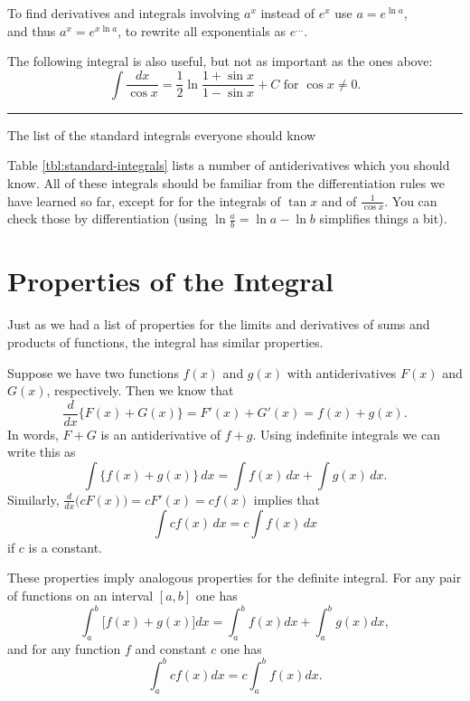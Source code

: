 \begin{table}[hb]
  To find derivatives and integrals involving $a^x$ instead of $e^x$ use
  $a = e^{\ln a}$,\\
  and thus $a^{x} = e^{x\ln a}$, to rewrite all exponentials as $e^{\ldots}$.
  \smallskip

  The following integral is also useful, but not as important as the
  ones above:
  \[
  \int \frac{ d x}{\cos x} = \frac12 \ln\frac{1+\sin x}{1-\sin x} +C
  \text{ for }\cos x\neq 0.
  \]
  \rule[1pt]{\textwidth}{2pt}
  \caption{The list of the standard integrals everyone should know}
  \label{tbl:standard-integrals}
\end{table}

Table \ref{tbl:standard-integrals} lists a number of antiderivatives which you
should know.  All of these integrals should be familiar from the
differentiation rules we have learned so far, except for for the integrals of
$\tan x$ and of $\frac1{\cos x}$.  You can check those by differentiation
(using $\ln\frac ab=\ln a-\ln b$ simplifies things a bit).


\section{Properties of the Integral}
Just as we had a list of properties for the limits and derivatives of
sums and products of functions, the integral has similar properties.

Suppose we have two functions $f(x)$ and $g(x)$ with antiderivatives
$F(x)$ and $G(x)$, respectively.  Then we know that
\[
\frac{d}{dx}\bigl\{F(x) + G(x)\bigr\} = F'(x) + G'(x) = f(x) + g(x).
\]
In words, $F+G$ is an antiderivative of $f+g$.  Using indefinite
integrals we can write this as
\begin{equation}
  \label{eq:sum-of-antiderivs}
  \int\bigl\{ f(x) + g(x) \bigr\}\, dx =
  \int f(x) \, dx +\int g(x) \, dx.
\end{equation}
Similarly, $\frac{d}{dx}\bigl(cF(x)\bigr) = cF'(x) = cf(x)$ implies
that
\begin{equation}
  \label{eq:constant-times-antideriv}
  \int cf(x) \, dx = c\int f(x) \, dx
\end{equation}
if $c$ is a constant.


These properties imply analogous properties for the definite integral.
For any pair of functions on an interval $[a, b]$ one has
\begin{equation}
  \label{eq:integral-additive}
  \int_a^b\bigl[f(x) + g(x) \bigr] dx = 
  \int_a^b f(x) dx + \int_a^bg(x) dx,
\end{equation}
and for any function $f$ and constant $c$ one has
\begin{equation}
  \label{eq:integral-homogeneous}
  \int_a^b cf(x) dx = c\int_a^bf(x)dx.
\end{equation}


